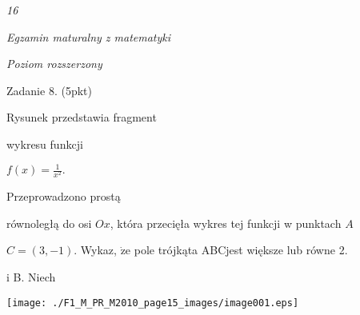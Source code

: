 \documentclass[a4paper,12pt]{article}
\begin{document}
{\it 16}

{\it Egzamin maturalny z matematyki}

{\it Poziom rozszerzony}

Zadanie 8. (5pkt)

Rysunek przedstawia fragment

wykresu funkcji

$f(x)=\displaystyle \frac{1}{x^{2}}.$

Przeprowadzono prostą

równoległą do osi $Ox$, która przecięła wykres tej funkcji w punktach $A$

$C=(3,-1)$. Wykaz, $\dot{\mathrm{z}}\mathrm{e}$ pole trójkąta ABCjest większe lub równe 2.

i B. Niech
\begin{center}
\texttt{[image: ./F1\_M\_PR\_M2010\_page15\_images/image001.eps]}
\end{center}
\end{document}
